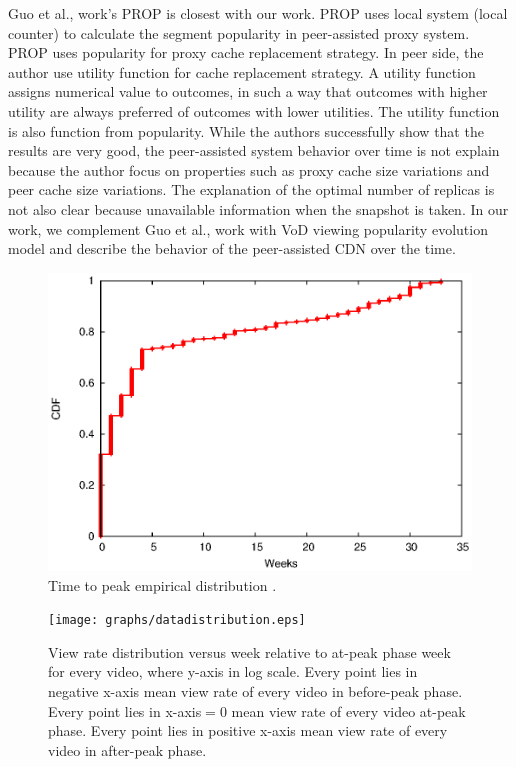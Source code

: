 \documentclass[10pt,final,journal,a4paper]{IEEEtran}
\begin{document}
Guo et al., \cite{1613869} work's PROP is closest with our work.
PROP uses local system (local counter) to calculate the segment popularity in peer-assisted proxy system. 
PROP uses popularity for proxy cache replacement strategy. 
In peer side, the author use utility function for cache replacement strategy.
A utility function assigns numerical value to outcomes, in such a way that outcomes with higher utility are always preferred of outcomes with lower utilities.
The utility function is also function from popularity.
While the authors successfully show that the results are very good, the peer-assisted system behavior over time is not explain because the author focus on properties such as proxy cache size variations and peer cache size variations.
The explanation of the optimal number of replicas is not also clear because unavailable information when the snapshot is taken.  
In our work, we complement Guo et al., \cite{1613869} work with VoD viewing popularity evolution model and describe the behavior of the peer-assisted CDN over the time.

\begin{figure}[!t]
\begin{center}
\includegraphics[scale=0.6]{graphs/timetopeak.eps}
\end{center}
\caption{Time to peak empirical distribution \cite{Borghol:2011:CMP:2039452.2039717}.}
\label{fig:timetopeak}
\end{figure} 


\begin{figure}[!t]
\begin{center}
\texttt{[image: graphs/datadistribution.eps]}
\end{center}
\caption{View rate distribution versus week relative to at-peak phase week for every video, where y-axis in log scale.
Every point lies in negative x-axis mean view rate of every video in before-peak phase.
Every point lies in x-axis$=0$ mean view rate of every video at-peak phase. 
Every point lies in positive x-axis mean view rate of every video in after-peak phase. }
\label{fig:viewratedistribution}
\end{figure} 
\end{document}
